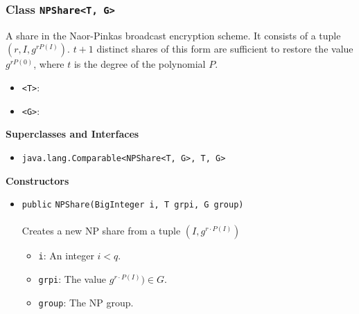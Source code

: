 \subsubsection{Class \lstinline|NPShare<T, G>|}
A share in the Naor-Pinkas broadcast encryption scheme. It consists of a tuple
 $(r, I, g^{r P(I)})$. $t + 1$ distinct shares of this form are sufficient to restore the
 value $g^{r P(0)}$, where $t$ is the degree of the polynomial $P$. \\
\noindent\begin{minipage}[t]{5cm}
\vspace{0.3em}
\hspace*{2em}
\vspace{0.3em}
\end{minipage}

\begin{itemize}
\item \lstinline|<T>|: 
\item \lstinline|<G>|: 
\end{itemize}


\textbf{\sffamily Superclasses and Interfaces}
\begin{itemize}
\item \lstinline|java.lang.Comparable<NPShare<T, G>, T, G>|
\end{itemize}


\textbf{\sffamily Constructors}
\begin{itemize}
\item \lstinline|public| \lstinline|NPShare|\lstinline|(BigInteger i, T grpi, G group)|\\ \\[-0.6em]
Creates a new NP share from a tuple $(I, g^{r \cdot P(I)})$
\begin{itemize}
\item \lstinline|i|: An integer $i < q$.
\item \lstinline|grpi|: The value $g^{r \cdot P(I)}) \in G$.
\item \lstinline|group|: The NP group.
\end{itemize}



\end{itemize}


